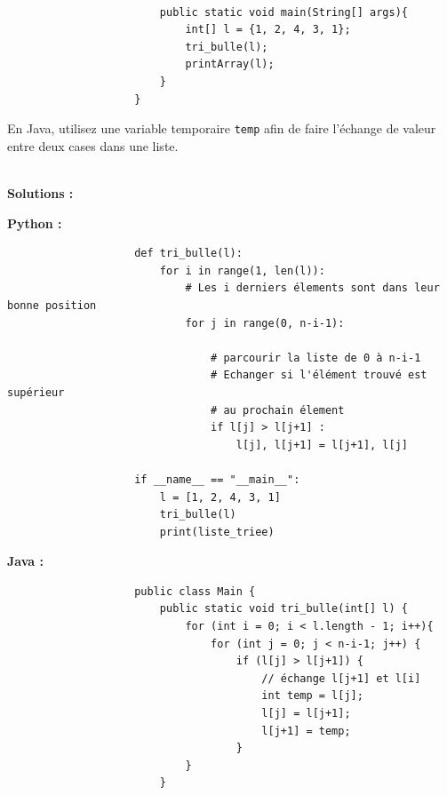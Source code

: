 \begin{Exercice} [20 minutes]
\begin{itemize}
\begin{verbatim}
                        
                        public static void main(String[] args){
                            int[] l = {1, 2, 4, 3, 1};
                            tri_bulle(l);
                            printArray(l);
                        }
                    }
                \end{verbatim}
    \end{itemize}
    
    \begin{conseil}
    En Java, utilisez une variable temporaire \lstinline{temp} afin de faire l'échange de valeur entre deux cases dans une liste.
    \end{conseil}
    
    \ \\
    
    \textbf{Solutions :}
    \item \textbf{Python :}
                \begin{verbatim}
                    def tri_bulle(l):
                        for i in range(1, len(l)):
                            # Les i derniers élements sont dans leur bonne position 
                            for j in range(0, n-i-1): 
                      
                                # parcourir la liste de 0 à n-i-1 
                                # Echanger si l'élément trouvé est supérieur 
                                # au prochain élement
                                if l[j] > l[j+1] : 
                                    l[j], l[j+1] = l[j+1], l[j] 
                    
                    if __name__ == "__main__":
                        l = [1, 2, 4, 3, 1]
                        tri_bulle(l)
                        print(liste_triee)
                \end{verbatim}
        \item \textbf{Java :}
                \begin{verbatim}
                    public class Main {
                        public static void tri_bulle(int[] l) {
                            for (int i = 0; i < l.length - 1; i++){
                                for (int j = 0; j < n-i-1; j++) {
                                    if (l[j] > l[j+1]) { 
                                        // échange l[j+1] et l[i] 
                                        int temp = l[j]; 
                                        l[j] = l[j+1]; 
                                        l[j+1] = temp; 
                                    } 
                            }
                        }
                        

\end{verbatim}
\end{Exercice}
